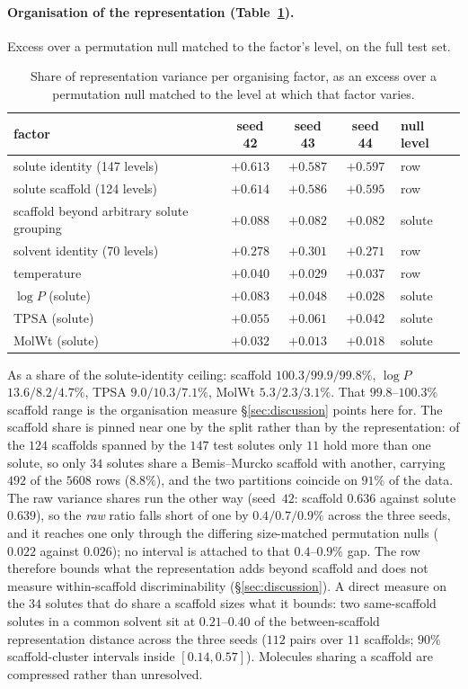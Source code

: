 \paragraph{Organisation of the representation (Table~\ref{tab:factor-variance}).} Excess over a permutation null matched
to the factor's level, on the full test set.

\begin{table}[t]
\centering\footnotesize
\begin{tabular}{lcccl}
\toprule
factor & seed 42 & seed 43 & seed 44 & null level \\
\midrule
solute identity (147 levels) & $+0.613$ & $+0.587$ & $+0.597$ & row \\
solute scaffold (124 levels) & $+0.614$ & $+0.586$ & $+0.595$ & row \\
scaffold beyond arbitrary solute grouping & $+0.088$ & $+0.082$ & $+0.082$ & solute \\
solvent identity (70 levels) & $+0.278$ & $+0.301$ & $+0.271$ & row \\
temperature & $+0.040$ & $+0.029$ & $+0.037$ & row \\
$\log P$ (solute) & $+0.083$ & $+0.048$ & $+0.028$ & solute \\
TPSA (solute) & $+0.055$ & $+0.061$ & $+0.042$ & solute \\
MolWt (solute) & $+0.032$ & $+0.013$ & $+0.018$ & solute \\
\bottomrule
\end{tabular}
\caption[Share of representation variance per organising factor]{Share of representation variance per organising factor, as an excess over a permutation null matched to the level at which that factor varies.}
\label{tab:factor-variance}
\end{table}

\noindent As a share of the solute-identity ceiling: scaffold $100.3/99.9/99.8\%$, $\log P$
$13.6/8.2/4.7\%$, TPSA $9.0/10.3/7.1\%$, MolWt $5.3/2.3/3.1\%$. That $99.8$--$100.3\%$ scaffold
range is the organisation measure \S\ref{sec:discussion} points here for. The scaffold share is pinned near one
by the split rather than by the representation: of the $124$ scaffolds spanned by the $147$ test
solutes only $11$ hold more than one solute, so only $34$ solutes share a Bemis--Murcko scaffold
with another, carrying $492$ of the $5608$ rows ($8.8\%$), and the two
partitions coincide on $91\%$ of the data. The raw variance shares run the other way
(seed~$42$: scaffold $0.636$ against solute $0.639$), so the \emph{raw} ratio falls short of one by
$0.4/0.7/0.9\%$ across the three seeds, and it reaches one only through the differing size-matched
permutation nulls ($0.022$ against $0.026$); no interval is attached to that
$0.4$--$0.9\%$ gap. The row therefore bounds what the representation adds beyond scaffold and does not
measure within-scaffold discriminability (\S\ref{sec:discussion}). A direct measure on the $34$
solutes that do share a scaffold sizes what it bounds: two same-scaffold solutes in a common solvent
sit at $0.21$--$0.40$ of the between-scaffold representation distance across the three seeds
($112$ pairs over $11$ scaffolds; $90\%$ scaffold-cluster intervals inside $[0.14,0.57]$). Molecules
sharing a scaffold are compressed rather than unresolved.

